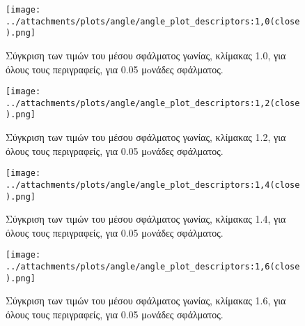  \begin{figure}[ht!]
\begin{minipage}[b]{1.0\linewidth}
\centering
\texttt{[image: ../attachments/plots/angle/angle\_plot\_descriptors:1,0(close).png]}
\caption{Σύγκριση των τιμών του μέσου σφάλματος γωνίας, κλίμακας 1.0, για όλους τους περιγραφείς, για 0.05 μoνάδες σφάλματος.}
\label{fig:plot_scale_des_1.0_low}
\end{minipage}
 \end{figure} 
 \begin{figure}[ht!]
\begin{minipage}[b]{1.0\linewidth}
\centering
\texttt{[image: ../attachments/plots/angle/angle\_plot\_descriptors:1,2(close).png]}
\caption{Σύγκριση των τιμών του μέσου σφάλματος γωνίας, κλίμακας 1.2, για όλους τους περιγραφείς, για 0.05 μoνάδες σφάλματος.}
\label{fig:plot_scale_des_1.2_low}
\end{minipage}

 \end{figure} 
 
 \newpage
 
 
 \begin{figure}[ht!]
\begin{minipage}[b]{1.0\linewidth}
\centering
\texttt{[image: ../attachments/plots/angle/angle\_plot\_descriptors:1,4(close).png]}
\caption{Σύγκριση των τιμών του μέσου σφάλματος γωνίας, κλίμακας 1.4, για όλους τους περιγραφείς, για 0.05 μoνάδες σφάλματος.}
\label{fig:plot_scale_des_1.4_low}
\end{minipage}
 \end{figure} 
 \begin{figure}[ht!]
\begin{minipage}[b]{1.0\linewidth}
\centering
\texttt{[image: ../attachments/plots/angle/angle\_plot\_descriptors:1,6(close).png]}
\caption{Σύγκριση των τιμών του μέσου σφάλματος γωνίας, κλίμακας 1.6, για όλους τους περιγραφείς, για 0.05 μoνάδες σφάλματος.}
\label{fig:plot_scale_des_1.6_low}
\end{minipage}

 \end{figure} 
 
 \newpage 
 
